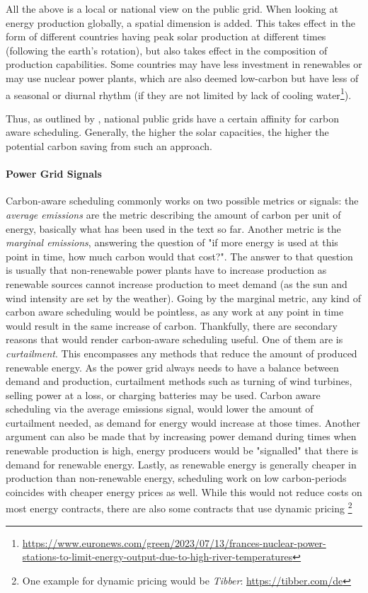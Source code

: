 All the above is a local or national view on the public grid. 
When looking at energy production globally, a spatial dimension is added. 
This takes effect in the form of different countries having peak solar production at different times (following the earth's rotation), but also takes effect in the composition of production capabilities.
Some countries may have less investment in renewables or may use nuclear power plants, which are also deemed low-carbon but have less of a seasonal or diurnal rhythm (if they are not limited by lack of cooling water\footnote{\url{https://www.euronews.com/green/2023/07/13/frances-nuclear-power-stations-to-limit-energy-output-due-to-high-river-temperatures}}).

Thus, as outlined by \cite{wiesner_lets_2021}, national public grids have a certain affinity for carbon aware scheduling. Generally, the higher the solar capacities, the higher the potential carbon saving from such an approach. 

\paragraph{Power Grid Signals}
Carbon-aware scheduling commonly works on two possible metrics or signals: the \emph{average emissions} are the metric describing the amount of carbon per unit of energy, basically what has been used in the text so far. Another metric is the \emph{marginal emissions}, answering the question of "if more energy is used at this point in time, how much carbon would that cost?". 
The answer to that question is usually that non-renewable power plants have to increase production as renewable sources cannot increase production to meet demand (as the sun and wind intensity are set by the weather). 
Going by the marginal metric, any kind of carbon aware scheduling would be pointless, as any work at any point in time would result in the same increase of carbon. 
Thankfully, there are secondary reasons that would render carbon-aware scheduling useful. One of them are is \emph{curtailment}. 
This encompasses any methods that reduce the amount of produced renewable energy. As the power grid always needs to have a balance between demand and production, curtailment methods such as turning of wind turbines, selling power at a loss, or charging batteries may be used. 
Carbon aware scheduling via the average emissions signal, would lower the amount of curtailment needed, as demand for energy would increase at those times.
Another argument can also be made that by increasing power demand during times when renewable production is high, energy producers would be "signalled" that there is demand for renewable energy.
Lastly, as renewable energy is generally cheaper in production than non-renewable energy, scheduling work on low carbon-periods coincides with cheaper energy prices as well. While this would not reduce costs on most energy contracts, there are also some contracts that use dynamic pricing \footnote{One example for dynamic pricing would be \emph{Tibber}: \url{https://tibber.com/de}}

